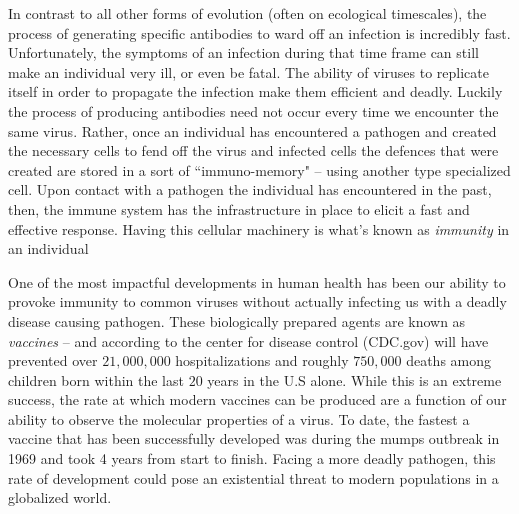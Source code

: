 \documentclass{article}
\begin{document}
In contrast to all other forms of evolution (often on ecological timescales), 
the process of generating specific antibodies to ward off an infection is incredibly fast.
Unfortunately, the symptoms of an infection during that time frame can still make an individual very ill, or even be fatal.
The ability of viruses to replicate itself in order to propagate the infection make them efficient and deadly.
Luckily the process of producing antibodies need not occur every time we encounter the same virus.
Rather, once an individual has encountered a pathogen and created the necessary cells to fend off the virus and infected cells the defences that were created are stored in a sort of ``immuno-memory" -- using another type specialized cell.
Upon contact with a pathogen the individual has encountered in the past, then,
the immune system has the infrastructure in place to elicit a fast and effective response.
Having this cellular machinery is what's known as \textit{immunity} in an individual

One of the most impactful developments in human health has been our ability to provoke immunity to common viruses without actually infecting us with a deadly disease causing pathogen.
These biologically prepared agents are known as \textit{vaccines} --
and according to the center for disease control (CDC.gov) will have prevented over $21,000,000$ hospitalizations and roughly $750,000$
deaths among children born within the last $20$ years in the U.S alone.
While this is an extreme success, the rate at which modern vaccines can be produced are a function of our ability to observe the molecular properties of a virus.
To date, the fastest a vaccine that has been successfully developed was during the mumps outbreak in 1969 and took 4 years from start to finish.
Facing a more deadly pathogen, this rate of development could pose an existential threat to modern populations in a globalized world.
\end{document}
